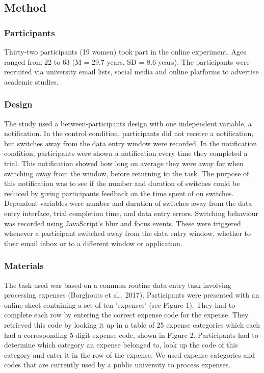 \subsection{Method}
\subsubsection{Participants}
Thirty-two participants (19 women) took part in the online experiment. Ages ranged from 22 to 63 (M = 29.7 years, SD = 8.6 years). The participants were recruited via university email lists, social media and online platforms to advertise academic studies. 

\subsubsection{Design}
The study used a between-participants design with one independent variable, a notification. In the control condition, participants did not receive a notification, but switches away from the data entry window were recorded. In the notification condition, participants were shown a notification every time they completed a trial. This notification showed how long on average they were away for when switching away from the window, before returning to the task. The purpose of this notification was to see if the number and duration of switches could be reduced by giving participants feedback on the time spent of on switches. Dependent variables were number and duration of switches away from the data entry interface, trial completion time, and data entry errors. Switching behaviour was recorded using JavaScript's blur and focus events. These were triggered whenever a participant switched away from the data entry window, whether to their email inbox or to a different window or application. 

\subsubsection{Materials}
The task used was based on a common routine data entry task involving processing expenses (Borghouts et al., 2017). Participants were presented with an online sheet containing a set of ten 'expenses' (see Figure 1). They had to complete each row by entering the correct expense code for the expense. They retrieved this code by looking it up in a table of 25 expense categories which each had a corresponding 5-digit expense code, shown in Figure 2. Participants had to determine which category an expense belonged to, look up the code of this category and enter it in the row of the expense. We used expense categories and codes that are currently used by a public university to process expenses.

